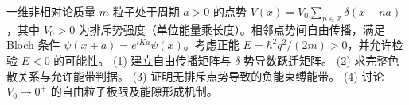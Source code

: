 一维非相对论质量 \(m\) 粒子处于周期 \(a>0\) 的点势 \(V(x)=V_0\sum_{n\in\mathbb Z}\delta(x-na)\)，其中 \(V_0>0\) 为排斥势强度（单位能量乘长度）。相邻点势间自由传播，满足 Bloch 条件 \(\psi(x+a)=e^{iKa}\psi(x)\)。考虑正能 \(E=\hbar^2q^2/(2m)>0\)，并允许检验 \(E<0\) 的可能性。
(1) 建立自由传播矩阵与 \(\delta \) 势导数跃迁矩阵。
(2) 求完整色散关系与允许能带判据。
(3) 证明无排斥点势导致的负能束缚能带。
(4) 讨论 \(V_0\to0^+\) 的自由粒子极限及能隙形成机制。
